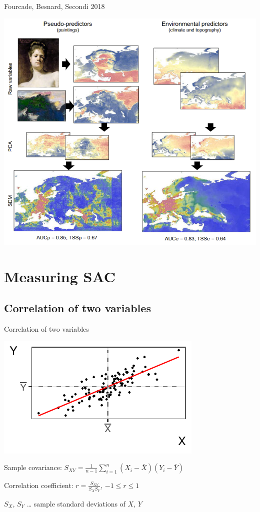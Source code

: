 \documentclass[
  ignorenonframetext,
]{beamer}
\begin{document}
\begin{frame}{Fourcade, Besnard, Secondi 2018}
\small

\includegraphics[width=\textwidth,height=0.9\textheight]{paint_scheme.png}
\end{frame}

\hypertarget{measuring-sac}{%
\section{Measuring SAC}\label{measuring-sac}}

\hypertarget{correlation-of-two-variables}{%
\subsection{Correlation of two
variables}\label{correlation-of-two-variables}}

\begin{frame}{Correlation of two variables}
\small

\includegraphics{Lecture_1_files/figure-beamer/unnamed-chunk-2-1.pdf}

Sample covariance:
\(S_{XY}=\frac{1}{n-1}\sum_{i=1}^n(X_i-\bar{X})(Y_i-\bar{Y})\)

Correlation coefficient: \(r=\frac{S_{XY}}{S_{X} S_{Y}}\),
\(-1 \le r \le 1\)

\(S_X\), \(S_Y\) \ldots{} sample standard deviations of \(X\), \(Y\)
\end{frame}
\end{document}
